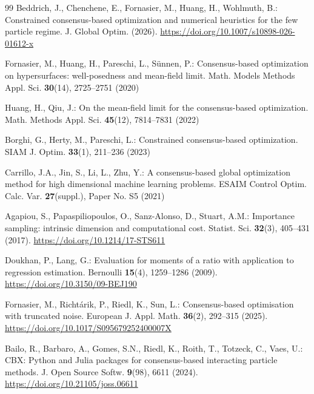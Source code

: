 \documentclass[pdflatex,sn-mathphys-num]{sn-jnl}
\theoremstyle{thmstyleone}
\theoremstyle{thmstyletwo}
\theoremstyle{thmstylethree}
\begin{document}
\begin{thebibliography}{99}
Beddrich, J., Chenchene, E., Fornasier, M., Huang, H., Wohlmuth, B.: Constrained consensus-based optimization and numerical heuristics for the few particle regime. J. Global Optim. (2026). \url{https://doi.org/10.1007/s10898-026-01612-x}

Fornasier, M., Huang, H., Pareschi, L., S\"unnen, P.: Consensus-based optimization on hypersurfaces: well-posedness and mean-field limit. Math. Models Methods Appl. Sci. \textbf{30}(14), 2725--2751 (2020)

Huang, H., Qiu, J.: On the mean-field limit for the consensus-based optimization. Math. Methods Appl. Sci. \textbf{45}(12), 7814--7831 (2022)

Borghi, G., Herty, M., Pareschi, L.: Constrained consensus-based optimization. SIAM J. Optim. \textbf{33}(1), 211--236 (2023)

Carrillo, J.A., Jin, S., Li, L., Zhu, Y.: A consensus-based global optimization method for high dimensional machine learning problems. ESAIM Control Optim. Calc. Var. \textbf{27}(suppl.), Paper No. S5 (2021)

Agapiou, S., Papaspiliopoulos, O., Sanz-Alonso, D., Stuart, A.M.: Importance sampling: intrinsic dimension and computational cost. Statist. Sci. \textbf{32}(3), 405--431 (2017). \url{https://doi.org/10.1214/17-STS611}

Doukhan, P., Lang, G.: Evaluation for moments of a ratio with application to regression estimation. Bernoulli \textbf{15}(4), 1259--1286 (2009). \url{https://doi.org/10.3150/09-BEJ190}

Fornasier, M., Richt\'arik, P., Riedl, K., Sun, L.: Consensus-based optimisation with truncated noise. European J. Appl. Math. \textbf{36}(2), 292--315 (2025). \url{https://doi.org/10.1017/S095679252400007X}

Bailo, R., Barbaro, A., Gomes, S.N., Riedl, K., Roith, T., Totzeck, C., Vaes, U.: CBX: Python and Julia packages for consensus-based interacting particle methods. J. Open Source Softw. \textbf{9}(98), 6611 (2024). \url{https://doi.org/10.21105/joss.06611}

\end{thebibliography}
\end{document}
